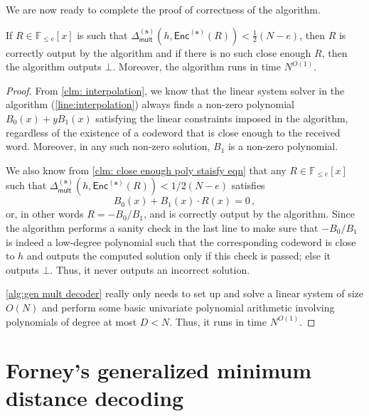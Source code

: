 \documentclass{theoretics}
\def\Field{\mathbb{F}}
\let\F\Field
\newcommand{\enc}{{\mathsf{Enc}}}
\newcommand{\Delm}{\Delta_{\mathsf{mult}}}
\newcommand{\sbar}{\mathbf{s}}
\begin{document}
	We are now ready to complete the proof of correctness of the algorithm. %
	\begin{theorem}\label{thm:correctness of generalized univariate multiplicity code decoder}
		If $R \in \F_{\leq e}[x]$ is such that $\Delm^{(\sbar)}(h,\enc^{(\sbar)}(R)) < \frac{1}{2}(N - e)$, 
		then $R$ is correctly output by the algorithm and  if there is no such
		close enough $R$, then the algorithm outputs $\bot$. Moreover, the algorithm runs in time $N^{O(1)}$. 
	\end{theorem}
	\begin{proof}
		From \autoref{clm: interpolation}, we know that the linear system solver in the algorithm (\cref{line:interpolation})  always finds a non-zero polynomial $B_0(x) + yB_1(x)$ satisfying the linear constraints imposed in the algorithm, regardless of the existence of a codeword that is close enough to the received word. Moreover, in any such non-zero solution, $B_1$ is a non-zero polynomial. 
		
		We also know from \autoref{clm: close enough poly staisfy eqn} that any $R \in \F_{\leq e}[x]$ such that $\Delm^{(\sbar)}(h,\enc^{(\sbar)}(R)) < 1/2(N -e)$ satisfies
		\[
		B_0(x) + B_1(x)\cdot R(x) = 0 \, ,
		\]
		or, in other words $R = -B_0/B_1$, and is correctly output by the algorithm. 
		Since the algorithm performs a sanity check in the last line to make sure that $-B_0/B_1$ is indeed a low-degree polynomial such that the corresponding codeword is close to $h$ and outputs the computed solution only if this check is passed; else it outputs $\bot$. Thus, it never outputs an incorrect solution. 
		
		\cref{alg:gen mult decoder} really only needs to set up and solve a linear system of size $O(N)$ and perform some basic univariate polynomial arithmetic involving polynomials of degree at most $D < N$. Thus, it runs in time $N^{O(1)}$. 
	\end{proof}
	
	
	\section{Forney's generalized minimum distance decoding}\label{sec:forney}
	
\end{document}

